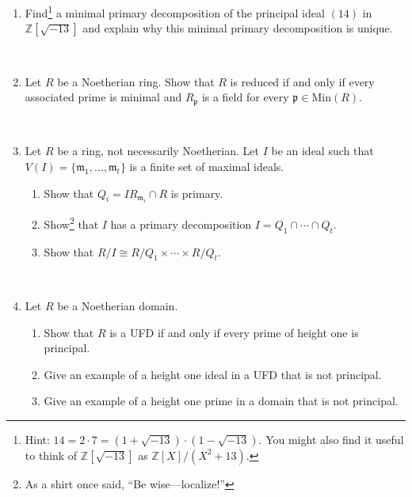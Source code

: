 \documentclass[12pt]{amsart}
\newcommand{\Z}{\mathbb{Z}}
\newcommand{\p}{\mathfrak{p}}
\newcommand{\m}{\mathfrak{m}}
\newcommand{\Min}{\mathrm{Min}}
\newcommand{\Ass}{\mathrm{Ass}}
\begin{document}
\begin{enumerate}

\item Find\footnote{Hint: $14=2\cdot 7 = (1+\sqrt{-13}) \cdot (1-\sqrt{-13})$. You might also find it useful to think of $\Z[\sqrt{-13}]$ as $\Z[X]/(X^2+13)$.} a minimal primary decomposition of the principal ideal $(14)$ in $\Z[\sqrt{-13}]$ and explain why this minimal primary decomposition is unique.

\

\item Let $R$ be a Noetherian ring. Show that $R$ is reduced if and only if every associated prime is minimal and $R_\p$ is a field for every $\p\in \Min(R)$.

\

\item Let $R$ be a ring, not necessarily Noetherian. Let $I$ be an ideal such that $V(I) = \{ \m_1,\ldots,\m_t \}$ is a finite set of maximal ideals. 
	\begin{enumerate}
		\item Show that $Q_i = I R_{\m_i} \cap R$ is primary.
		\item Show\footnote{As a shirt once said, ``Be wise---localize!''} that $I$ has a primary decomposition $I=Q_1 \cap \cdots \cap Q_t$.
		\item Show that $R/I \cong R/Q_1 \times \cdots \times R/Q_t$.
	\end{enumerate}


\


\item Let $R$ be a {\color{chianti}Noetherian} domain. 
\begin{enumerate}
\item Show that $R$ is a UFD if and only if every prime of height one is principal.
\item Give an example of a height one ideal in a UFD that is not principal.
\item Give an example of a height one prime in a domain that is not principal.
\end{enumerate}



\end{enumerate}
\end{document}
